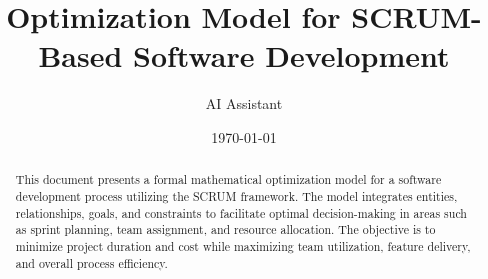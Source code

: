 \documentclass[11pt]{article}
\title{Optimization Model for SCRUM-Based Software Development}
\author{AI Assistant}
\date{\today}
\begin{document}
\begin{titlingpage}
    \maketitle
    \begin{abstract}
        This document presents a formal mathematical optimization model for a software development process utilizing the SCRUM framework. The model integrates entities, relationships, goals, and constraints to facilitate optimal decision-making in areas such as sprint planning, team assignment, and resource allocation. The objective is to minimize project duration and cost while maximizing team utilization, feature delivery, and overall process efficiency.
    \end{abstract}
    \tableofcontents
\end{titlingpage}
\end{document}
